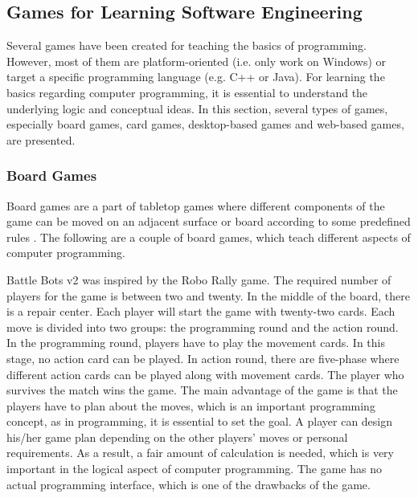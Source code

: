 \subsection{Games for Learning Software Engineering}
Several games have been created for teaching the basics of programming. However, most of them are platform-oriented (i.e. only work on Windows) or target a specific programming language (e.g. C++ or Java). For learning the basics regarding computer programming, it is essential to understand the underlying logic and conceptual ideas. In this section, several types of games, especially board games, card games, desktop-based games and web-based games, are presented.

\subsubsection{Board Games}
Board games are a part of tabletop games where different components of the game can be moved on an adjacent surface or board according to some predefined rules \cite{boardgames}. The following are a couple of board games, which teach different aspects of computer programming.

Battle Bots v2 \cite{BattleBotsv2}  was inspired by the Robo Rally \cite{roborally} game. The required number of players for the game is between two and twenty. In the middle of the board, there is a repair center. Each player will start the game with twenty-two cards. Each move is divided into two groups: the programming round and the action round. In the programming round, players have to play the movement cards. In this stage, no action card can be played. In action round, there are five-phase where different action cards can be played along with movement cards. The player who survives the match wins the game. The main advantage of the game is that the players have to plan about the moves, which is an important programming concept, as in programming, it is essential to set the goal. A player can design his/her game plan depending on the other players’ moves or personal requirements. As a result, a fair amount of calculation is needed, which is very important in the logical aspect of computer programming. The game has no actual programming interface, which is one of the drawbacks of the game. 

